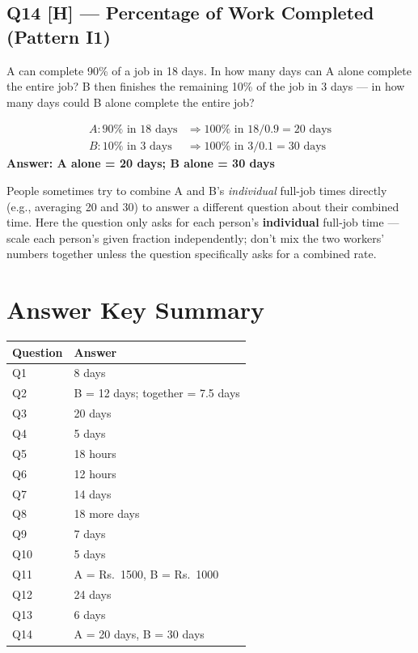 \documentclass[11pt]{article}
\begin{document}
\subsection*{Q14 [H] --- Percentage of Work Completed (Pattern I1)}
A can complete 90\% of a job in 18 days. In how many days can A alone complete the entire job? B then
finishes the remaining 10\% of the job in 3 days --- in how many days could B alone complete the
entire job?

\begin{tipbox}[Solution]
\begin{align*}
A: 90\% \text{ in 18 days} &\Rightarrow 100\% \text{ in } 18/0.9 = 20 \text{ days} \\
B: 10\% \text{ in 3 days} &\Rightarrow 100\% \text{ in } 3/0.1 = 30 \text{ days}
\end{align*}
\textbf{Answer: A alone = 20 days; B alone = 30 days}
\end{tipbox}

\begin{warnbox}
People sometimes try to combine A and B's \emph{individual} full-job times directly (e.g., averaging
20 and 30) to answer a different question about their combined time. Here the question only asks for
each person's \textbf{individual} full-job time --- scale each person's given fraction
independently; don't mix the two workers' numbers together unless the question specifically asks for
a combined rate.
\end{warnbox}

\section*{Answer Key Summary}
\begin{formulabox}[Answers]
\centering
\begin{tabular}{ll}
\toprule
\textbf{Question} & \textbf{Answer} \\
\midrule
Q1 & 8 days \\
Q2 & B = 12 days; together = 7.5 days \\
Q3 & 20 days \\
Q4 & 5 days \\
Q5 & 18 hours \\
Q6 & 12 hours \\
Q7 & 14 days \\
Q8 & 18 more days \\
Q9 & 7 days \\
Q10 & 5 days \\
Q11 & A = Rs.~1500, B = Rs.~1000 \\
Q12 & 24 days \\
Q13 & 6 days \\
Q14 & A = 20 days, B = 30 days \\
\bottomrule
\end{tabular}
\end{formulabox}
\end{document}
